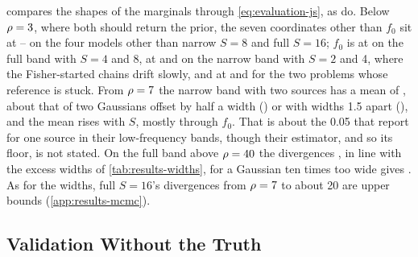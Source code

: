 compares the shapes of the marginals through \cref{eq:evaluation-js}, as
\citet{delmond2026neural} do. Below $\rho=3$, where both should return the prior, the seven
coordinates other than $f_0$ sit at \ResultsJsFaintLo--\ResultsJsFaintHi{} on the four models other
than narrow $S=8$ and full $S=16$; $f_0$ is at \ResultsJsFaintFullFzero{} on the full band with $S=4$
and 8, at \ResultsJsFaintNarrowTwoFzero{} and \ResultsJsFaintNarrowFourFzero{} on the narrow band
with $S=2$ and 4, where the Fisher-started chains drift slowly, and at
\ResultsJsFaintNarrowEightFzero{} and \ResultsJsFaintFullSixteenFzero{} for the two problems whose
reference is stuck. From $\rho=7$ the narrow band with two sources has a mean of
\ResultsJsNarrowTwoMean, about that of two Gaussians offset by half a width
(\ResultsJsGaussOffsetHalf) or with widths 1.5 apart (\ResultsJsGaussWidthOneHalf), and the mean
rises with $S$, mostly through $f_0$. That is about the \num{0.05} that \citet{delmond2026neural}
report for one source in their low-frequency bands, though their estimator, and so its floor, is not
stated. On the full band above $\rho=40$ the divergences ,
in line with the excess widths of
\cref{tab:results-widths}, for a Gaussian ten times too wide gives \ResultsJsGaussWidthTen. As for
the widths, full $S=16$'s divergences from $\rho=7$ to about 20 are upper bounds
(\cref{app:results-mcmc}).

\subsection{Validation Without the Truth}
\label{app:results-validation}

